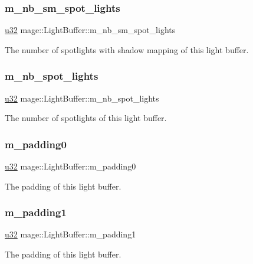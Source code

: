 \subsubsection{\texorpdfstring{m\+\_\+nb\+\_\+sm\+\_\+spot\+\_\+lights}{m\_nb\_sm\_spot\_lights}}
{\footnotesize\ttfamily \hyperlink{namespacemage_af2b398bf98eb10351f49cad73fe2cc73}{u32} mage\+::\+Light\+Buffer\+::m\+\_\+nb\+\_\+sm\+\_\+spot\+\_\+lights}

The number of spotlights with shadow mapping of this light buffer. \hypertarget{structmage_1_1_light_buffer_a5061a754278a9dfd49480a72f17eb1a0}{}\label{structmage_1_1_light_buffer_a5061a754278a9dfd49480a72f17eb1a0} 
\subsubsection{\texorpdfstring{m\+\_\+nb\+\_\+spot\+\_\+lights}{m\_nb\_spot\_lights}}
{\footnotesize\ttfamily \hyperlink{namespacemage_af2b398bf98eb10351f49cad73fe2cc73}{u32} mage\+::\+Light\+Buffer\+::m\+\_\+nb\+\_\+spot\+\_\+lights}

The number of spotlights of this light buffer. \hypertarget{structmage_1_1_light_buffer_ab5cdd2009e930895f316a348102663b5}{}\label{structmage_1_1_light_buffer_ab5cdd2009e930895f316a348102663b5} 
\subsubsection{\texorpdfstring{m\+\_\+padding0}{m\_padding0}}
{\footnotesize\ttfamily \hyperlink{namespacemage_af2b398bf98eb10351f49cad73fe2cc73}{u32} mage\+::\+Light\+Buffer\+::m\+\_\+padding0}

The padding of this light buffer. \hypertarget{structmage_1_1_light_buffer_a34cbefbfe7822c094ba2a2800c1b93bf}{}\label{structmage_1_1_light_buffer_a34cbefbfe7822c094ba2a2800c1b93bf} 
\subsubsection{\texorpdfstring{m\+\_\+padding1}{m\_padding1}}
{\footnotesize\ttfamily \hyperlink{namespacemage_af2b398bf98eb10351f49cad73fe2cc73}{u32} mage\+::\+Light\+Buffer\+::m\+\_\+padding1}

The padding of this light buffer. 